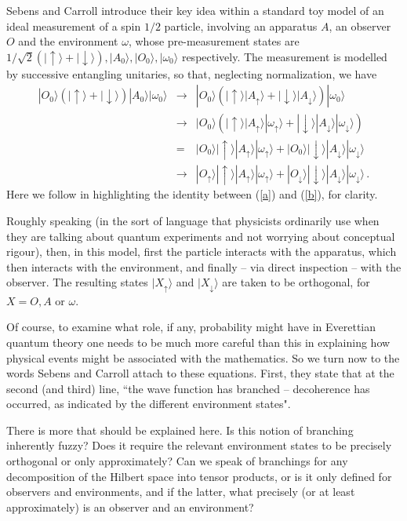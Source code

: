 \documentclass[aps,prl,12pt]{revtex4}
\def\ket#1{| #1\rangle}
\begin{document}
Sebens and Carroll \cite{cs2} introduce their key idea 
within a standard toy
model of an ideal measurement of a spin $1/2$ particle, 
involving an apparatus $A$, an observer $O$ and the environment
$\omega$, whose pre-measurement states are $ 1/\sqrt{2} (
\ket{\uparrow} + \ket{\downarrow} ), \ket{A_0}, \ket{O_0}, 
\ket{\omega_0}$ respectively.  The measurement is modelled
by successive entangling unitaries, so that, neglecting
normalization, we have
\begin{eqnarray}
\ket{O_0} ( \ket{ \uparrow } + \ket{ \downarrow }) \ket{A_0}
\ket{\omega_0} 
& \rightarrow & 
\ket{O_0} ( \ket{ \uparrow } \ket{A_{\uparrow}} + 
\ket{ \downarrow } \ket{A_{\downarrow}} ) 
\ket{\omega_0}  \\ 
& \rightarrow & 
\ket{O_0} ( \ket{ \uparrow } \ket{A_{\uparrow}}
\ket{\omega_{\uparrow}} + 
\ket{ \downarrow } \ket{A_{\downarrow}} \ket{\omega_{\downarrow}} ) \label{a} \\
& = & 
\ket{O_0}  \ket{ \uparrow } \ket{A_{\uparrow}}
\ket{\omega_{\uparrow}} + 
\ket{O_0} 
\ket{ \downarrow } \ket{A_{\downarrow}}
\ket{\omega_{\downarrow}}  \label{b} \\ 
& \rightarrow &
\ket{O_{\uparrow}}  \ket{ \uparrow } \ket{A_{\uparrow}}
\ket{\omega_{\uparrow}} + 
\ket{O_{\downarrow}}
\ket{ \downarrow } \ket{A_{\downarrow}} \ket{\omega_{\downarrow}} \,
. 
\end{eqnarray}
Here we follow \cite{cs2} in highlighting the identity 
between (\ref{a}) and (\ref{b}), for clarity.  

Roughly speaking (in the sort of language that physicists ordinarily 
use when they are talking about quantum experiments and not worrying about 
conceptual rigour), then,
in this model, first the particle interacts with the apparatus,
which then interacts with the environment, and finally -- 
via direct inspection -- with the observer.
The resulting states $\ket{X_{\uparrow}}$ and $\ket{X_{\downarrow}}$
are taken to be orthogonal, for $X = O, A$ or $\omega$.  

Of course, to examine what role, if any, probability might
have in Everettian quantum theory one needs to be much more
careful than this in explaining how physical events might be
associated with the mathematics.
So we turn now to the words Sebens and Carroll 
attach to these equations.  
First, they state that at 
the second (and third) line, 
``the wave function has
branched -- decoherence has occurred, as indicated by the 
different environment states".   

There is more that
should be explained here.  Is this notion
of branching inherently fuzzy?   Does it require
the relevant environment states to be precisely orthogonal
or only approximately?   Can we speak of branchings for 
any decomposition of the Hilbert space into tensor products,
or is it only defined for observers and environments, and
if the latter, what precisely (or at least approximately) is an observer
and an environment?  
\end{document}
